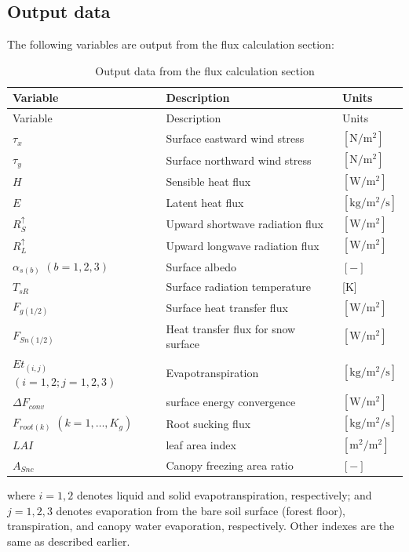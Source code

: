 \subsection{Output data}\label{output-data}

The following variables are output from the flux calculation section:

\begin{longtable}[]{@{}lll@{}}
\caption{Output data from the flux calculation section}\tabularnewline
\toprule\noalign{}
Variable & Description & Units \\
\midrule\noalign{}
\endfirsthead
\toprule\noalign{}
Variable & Description & Units \\
\midrule\noalign{}
\endhead
\bottomrule\noalign{}
\endlastfoot
\(\tau_x\) & Surface eastward wind stress & \(\mathrm{[N/m^2]}\) \\
\(\tau_y\) & Surface northward wind stress & \(\mathrm{[N/m^2]}\) \\
\(H\) & Sensible heat flux & \(\mathrm{[W/m^2]}\) \\
\(E\) & Latent heat flux & \(\mathrm{[kg/m^2/s]}\) \\
\(R^{\uparrow}_S\) & Upward shortwave radiation flux & \(\mathrm{[W/m^2]}\) \\
\(R^{\uparrow}_L\) & Upward longwave radiation flux & \(\mathrm{[W/m^2]}\) \\
\(\alpha_{s(b)}\) \((b=1,2,3)\) & Surface albedo & \(\mathrm{[-]}\) \\
\(T_{sR}\) & Surface radiation temperature & {[}K{]} \\
\(F_{g(1/2)}\) & Surface heat transfer flux & \(\mathrm{[W/m^2]}\) \\
\(F_{Sn(1/2)}\) & Heat transfer flux for snow surface & \(\mathrm{[W/m^2]}\) \\
\(Et_{(i,j)}\) \((i=1,2;j=1,2,3)\) & Evapotranspiration & \(\mathrm{[kg/m^2/s]}\) \\
\(\Delta F_{conv}\) & surface energy convergence & \(\mathrm{[W/m^2]}\) \\
\(F_{root(k)}\) \((k=1,\ldots,K_g)\) & Root sucking flux & \(\mathrm{[kg/m^2/s]}\) \\
\(LAI\) & leaf area index & \(\mathrm{[m^2/m^2]}\) \\
\(A_{Snc}\) & Canopy freezing area ratio & \(\mathrm{[-]}\) \\
\end{longtable}

where \(i=1,2\) denotes liquid and solid evapotranspiration, respectively; and \(j=1,2,3\) denotes evaporation from the bare soil surface (forest floor), transpiration, and canopy water evaporation,
respectively. Other indexes are the same as described earlier.

